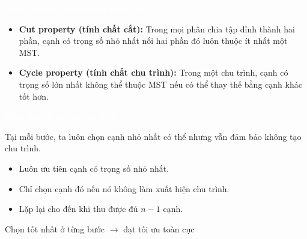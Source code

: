 \documentclass{beamer}
\newcommand{\hlblue}[1]{\textcolor{myblue}{#1}}
\newcommand{\hlgreen}[1]{\textcolor{mygreen}{#1}}
\newcommand{\hlred}[1]{\textcolor{myred}{#1}}
\newcommand{\hlpurple}[1]{\textcolor{mypurple}{#1}}
\newcommand{\hlwhite}[1]{\textcolor{white}{#1}}
\begin{document}

\begin{frame}{\hlwhite{Thuộc tính cắt và chu trình (tóm tắt)}}
\begin{itemize}
  \item \textbf{\hlgreen{Cut property (tính chất cắt):}} Trong mọi phân chia tập đỉnh thành hai phần, cạnh có \hlred{trọng số nhỏ nhất} nối hai phần đó luôn thuộc ít nhất một MST.
  \item \textbf{\hlpurple{Cycle property (tính chất chu trình):}} Trong một chu trình, cạnh có \hlred{trọng số lớn nhất} không thể thuộc MST nếu có thể thay thế bằng cạnh khác tốt hơn.
\end{itemize}
\end{frame}


\begin{frame}{\hlwhite{Tính chất tham lam của MST}}
\begin{tcolorbox}[title=\textbf{\hlgreen{Ý tưởng tham lam}}]
Tại mỗi bước, ta luôn chọn cạnh \hlred{nhỏ nhất có thể} nhưng vẫn đảm bảo \hlblue{không tạo chu trình}.
\end{tcolorbox}

\begin{itemize}
  \item Luôn ưu tiên cạnh có \hlred{trọng số nhỏ nhất}.
  \item Chỉ chọn cạnh đó nếu nó \hlgreen{không làm xuất hiện chu trình}.
  \item Lặp lại cho đến khi thu được đủ \hlblue{$n-1$ cạnh}.
\end{itemize}

\begin{tcolorbox}
\centering
\hlpurple{Chọn tốt nhất ở từng bước \(\rightarrow\) đạt tối ưu toàn cục}
\end{tcolorbox}
\end{frame}

\end{document}
